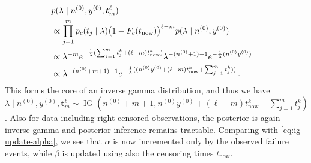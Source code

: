 \documentclass[12pt,a4paper,twocolumn,fleqn]{narms}
\renewcommand{\vec}[1]{{\bm#1}}
\newcommand{\uz}{^{(0)}} %
\newcommand{\ig}{\operatorname{IG}}   %
\def\yz{y\uz}
\def\nz{n\uz}
\begin{document}
\begin{align}
\lefteqn{p(\lambda \mid \nz, \yz, \vec{t}_m^\ell)} \\
	&\propto \prod_{j=1}^{m} p_c(t_j \mid \lambda) \big(1 - F_c(t_\text{now})\big)^{\ell-m} p(\lambda\mid \nz, \yz) \nonumber \\
	&\propto \lambda^{-m} e^{-\frac{1}{\lambda}(\sum_{j=1}^{m} t_j^k + (\ell-m) t_\text{now}^k)}
           \lambda^{-(\nz+1)-1}   e^{-\frac{1}{\lambda}(\nz \yz)} \nonumber \\
	&\propto \lambda^{-(\nz+m+1)-1} e^{-\frac{1}{\lambda}((\nz \yz + (\ell-m) t_\text{now}^k + \sum_{j=1}^{m} t_j^k))} \,. \nonumber
\end{align}
This forms the core of an inverse gamma distribution, and thus we have
$\lambda \mid \nz, \yz, \vec{t}_m^\ell \sim \ig\left(\nz + m + 1, \nz \yz + (\ell-m) t_\text{now}^k + \sum_{j=1}^{m}t_j^k \right)$.
Also for data including right-censored observations,
the posterior is again inverse gamma and posterior inference remains tractable.
Comparing with \eqref{eq:ig-update-alpha},
we see that $\alpha$ is now incremented only by the observed failure events,
while $\beta$ is updated using also the censoring times $t_\text{now}$.
\end{document}
